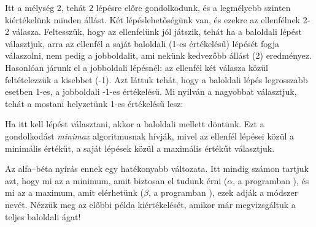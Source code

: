 Itt a mélység 2, tehát 2 lépésre előre gondolkodunk,
és a legmélyebb szinten kiértékelünk minden
állást. Két lépéslehetőségünk van, és ezekre az
ellenfélnek 2-2 válasza. Feltesszük, hogy az
ellenfelünk jól játszik, tehát ha a baloldali lépést
választjuk, arra az ellenfél a saját baloldali (1-es
értékelésű) lépését fogja válaszolni, nem pedig a
jobboldalit, ami nekünk kedvezőbb állást (2)
eredményez. Hasonlóan járunk el a jobboldali
lépésnél: az ellenfél két válasza közül
feltételezzük a kisebbet (-1). Azt láttuk tehát,
hogy a baloldali lépés legrosszabb esetben 1-es, a
jobboldali -1-es értékelésű. Mi nyilván a nagyobbat
választjuk, tehát a mostani helyzetünk 1-es
értékelésű lesz:

\begin{center}
\end{center}

Ha itt kell lépést választani, akkor a baloldali
mellett döntünk. Ezt a gondolkodást \emph{minimax}
algoritmusnak hívják, mivel az ellenfél lépései
közül a minimális értékűt, a saját lépések közül a
maximális értékűt választjuk.

Az alfa--béta nyírás ennek egy hatékonyabb
változata. Itt mindig számon tartjuk azt, hogy mi az
a minimum, amit biztosan el tudunk érni ($\alpha$, a
programban ), és mi az a maximum, amit
elérhetünk ($\beta$, a programban ), ezek
adják a módszer nevét. Nézzük meg az előbbi példa
kiértékelését, amikor már megvizsgáltuk a teljes
baloldali ágat!

\begin{center}
\end{center}

